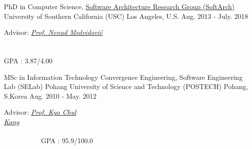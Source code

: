 

\begin{cventries}

  \cventry
    {PhD in Computer Science, \href{http://softarch.usc.edu/} {Software Architecture Research Group (SoftArch)}} %
    {University of Southern California (USC)} %
    {Los Angeles, U.S.} %
	{Aug. 2013 - July. 2018} %
    {
      \begin{cvitems} %
       	\item Advisor: {\em \href{http://sunset.usc.edu/~neno/}{Prof. Nenad Medvidović} ~~~~~~~~~~~~~~~~~~~~~~~~~~~~~~~~~~~~~~~~~~~~~~~~~~~~~~~~~~~~~~~~~~~~~~~~~~~~~~~~~~~~~~~~~~~~~~~~~~~~~~~~~~~~~~~~~~~~~~~~~~~~~~~~~~~~~~~~~~~}GPA : 3.87/4.00
      \end{cvitems}
    }
    
  \cventry
  {MSc in Information Technology Convergence Engineering, {Software Engineering Lab (SELab)}} %
  {Pohang University of Science and Technology (POSTECH)} %
  {Pohang, S.Korea} %
  {Aug. 2010 - May. 2012} %
  {
     	\begin{cvitems} %
     		\item Advisor: {\em \href{http://cse.postech.ac.kr/prof/kck/}{Prof. Kyo Chul Kang}~~~~~~~~~~~~~~~~~~~~~~~~~~~~~~~~~~~~~~~~~~~~~~~~~~~~~~~~~~~~~~~~~~~~~~~~~~~~~~~~~~~~~~~~~~~~~~~~~~~~~~~~~~~~~~~~~~~~~~~~~~~~~~~~~~~~~~~~~~~~~~~~~~} GPA : 95.9/100.0
     	\end{cvitems}
  }
  

\end{cventries}

